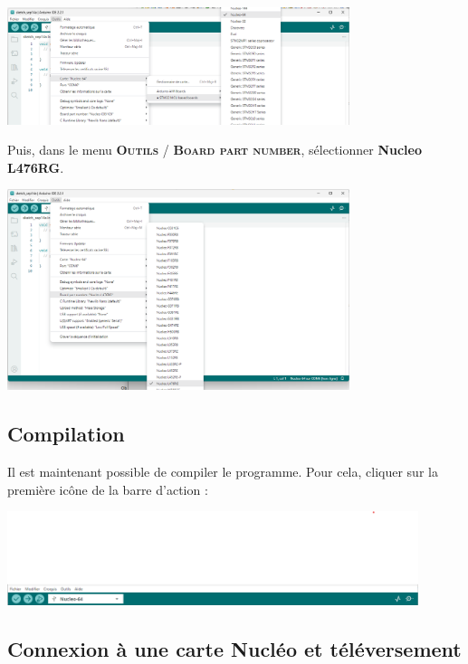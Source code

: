 \documentclass[a4paper,11pt,titlepage]{article} %
\begin{document}
\begin{center}
	\includegraphics[width=0.75\textwidth]{images/arduino_outils_cartes_nucleo64.png}
\end{center}

Puis, dans le menu \textsc{\textbf{Outils} / \textbf{Board part number}}, sélectionner \textbf{Nucleo L476RG}.

\begin{center}
	\includegraphics[width=0.75\textwidth]{images/arduino_cartes_nucleo_lxxx.png}
\end{center}

\subsection{Compilation}

Il est maintenant possible de compiler le programme. Pour cela, cliquer sur la première icône de la barre d'action :

\begin{center}
	\includegraphics[width=0.9\textwidth]{images/arduino_compile_run.png}
\end{center}

\bigskip


\subsection{Connexion à une carte Nucléo et téléversement}
\end{document}
